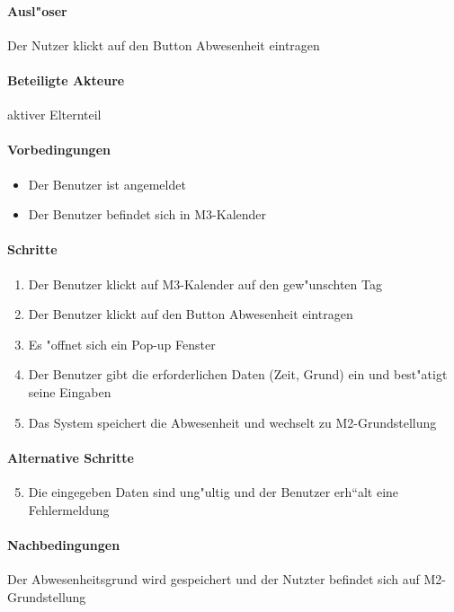   \paragraph{Ausl"oser}
  Der Nutzer klickt auf den Button \dq Abwesenheit eintragen\dq
  \paragraph{Beteiligte Akteure}   \leavevmode \newline
    aktiver Elternteil
  \paragraph{Vorbedingungen}
  \begin{itemize}
   \item Der Benutzer ist angemeldet
   \item Der Benutzer befindet sich in M3-Kalender
  \end{itemize}

  \paragraph{Schritte}
  \begin{enumerate}
   \item Der Benutzer klickt auf M3-Kalender auf den gew"unschten Tag
   \item Der Benutzer klickt auf den Button \dq Abwesenheit eintragen\dq
   \item Es "offnet sich ein Pop-up Fenster
   \item Der Benutzer gibt die erforderlichen Daten (Zeit, Grund) ein und best"atigt seine Eingaben
   \item Das System speichert die Abwesenheit und wechselt zu M2-Grundstellung
  \end{enumerate}

  \paragraph{Alternative Schritte}
  \begin{enumerate}
  \setcounter{enumi}{4}
   \item Die eingegeben Daten sind ung"ultig und der Benutzer erh``alt eine Fehlermeldung
  \end{enumerate}

  \paragraph{Nachbedingungen}
  Der Abwesenheitsgrund wird gespeichert und der Nutzter befindet sich auf M2-Grundstellung

